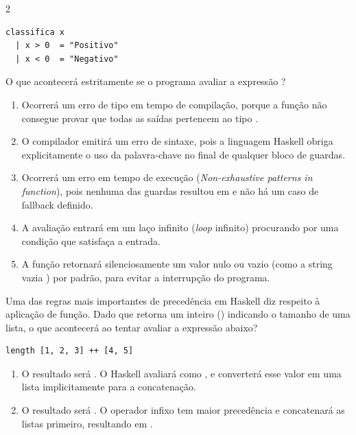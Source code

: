 \documentclass[a4paper,10pt,brazil]{article}
\begin{document}
\begin{multicols}{2}
\begin{verbatim}
classifica x
  | x > 0  = "Positivo"
  | x < 0  = "Negativo"
\end{verbatim}

O que acontecerá estritamente se o programa avaliar a expressão ?

\begin{enumerate}
  \item Ocorrerá um erro de tipo em tempo de compilação, porque a função não consegue provar que todas as saídas pertencem ao tipo .

  \item O compilador emitirá um erro de sintaxe, pois a linguagem Haskell obriga explicitamente o uso da palavra-chave  no final de qualquer bloco de guardas.

  \item Ocorrerá um erro em tempo de execução (\emph{Non-exhaustive patterns in function}), pois nenhuma das guardas resultou em  e não há um caso de fallback definido.

  \item A avaliação entrará em um laço infinito (\emph{loop} infinito) procurando por uma condição que satisfaça a entrada.

  \item A função retornará silenciosamente um valor nulo ou vazio (como a string vazia ) por padrão, para evitar a interrupção do programa.


\end{enumerate}

Uma das regras mais importantes de precedência em Haskell diz respeito à aplicação de função. Dado que  retorna um inteiro () indicando o tamanho de uma lista, o que acontecerá ao tentar avaliar a expressão abaixo?
\begin{verbatim}
length [1, 2, 3] ++ [4, 5]
\end{verbatim}

\begin{enumerate}
  \item O resultado será \haskellinline{[3, 4, 5]}. O Haskell avaliará  como , e converterá esse valor em uma lista implicitamente para a concatenação.

  \item O resultado será . O operador infixo \haskellinline{++} tem maior precedência e concatenará as listas primeiro, resultando em .


\end{enumerate}
\end{multicols}
\end{document}
